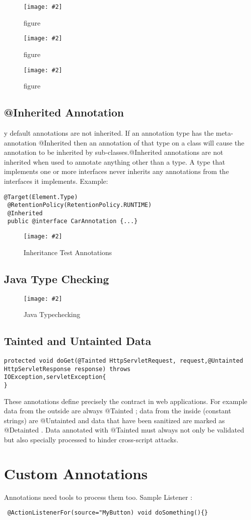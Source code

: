\documentclass[a4paper,10pt]{scrreprt}
\newcommand{\pic}[2][figure]{\begin{figure}[h]
 \centering
 \texttt{[image: \#2]}
 \caption{#1}
\end{figure}
}
\begin{document}
\pic{cnex.png}
\pic{cnpr.png}
\pic{cnsl.png}
\subsection{@Inherited Annotation}
y default annotations are not inherited. If an annotation type has the
meta-annotation @Inherited
then an annotation of that type on a class will cause the annotation to be inherited by sub-classes.@Inherited
annotations are not inherited when used to annotate anything other than a
type. A type that implements one or more interfaces never inherits any
annotations from the interfaces it implements. Example:

\begin{lstlisting}[caption=Inherited Example Annotations]
 @Target(Element.Type)
 @RetentionPolicy(RetentionPolicy.RUNTIME)
 @Inherited
 public @interface CarAnnotation {...}
\end{lstlisting}

\pic[Inheritance Test Annotations]{inhanno.png}

\subsection{Java Type Checking}
\pic[Java Typechecking]{typechecker.png}

\subsection{Tainted and Untainted Data}
\begin{lstlisting}[caption=Tainted and Untainted Annotations]
protected void doGet(@Tainted HttpServletRequest, request,@Untainted HttpServletResponse response) throws 
IOException,servletException{
}
\end{lstlisting}

These annotations define precisely the contract in web applications. For
example data from the outside are always @Tainted ; data from the inside
(constant strings) are @Untainted and data that have been sanitized are
marked as @Detainted . Data annotated with @Tainted must always not only be validated but also specially processed to 
hinder cross-script
attacks.
\section{Custom Annotations}

Annotations need tools to process them too.
Sample Listener : 
\begin{verbatim}
 @ActionListenerFor(source="MyButton) void doSomething(){}
 \end{verbatim}
\end{document}

